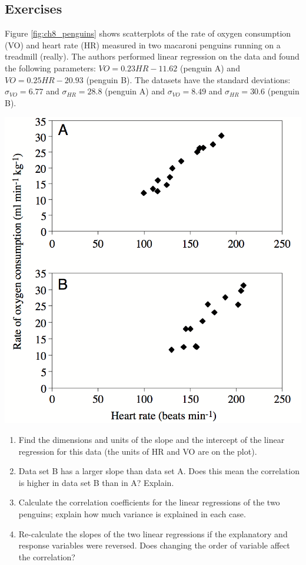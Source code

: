 \documentclass[
  letterpaper,
  DIV=11,
  numbers=noendperiod]{scrreprt}
\begin{document}
\hypertarget{exercises-12}{%
\subsection{Exercises}\label{exercises-12}}

Figure \ref{fig:ch8_penguins} shows scatterplots of the rate of oxygen
consumption (VO) and heart rate (HR) measured in two macaroni penguins
running on a treadmill (really). The authors performed linear regression
on the data and found the following parameters: \(VO =0.23HR - 11.62\)
(penguin A) and \(VO =0.25HR - 20.93\) (penguin B). The datasets have
the standard deviations: \(\sigma_{VO} = 6.77\) and
\(\sigma_{HR} = 28.8\) (penguin A) and \(\sigma_{VO} = 8.49\) and
\(\sigma_{HR} = 30.6\) (penguin B).

\includegraphics{./ch8/penguin_HR.png} \label{fig:ch8_penguins}

\begin{enumerate}
\def\labelenumi{\arabic{enumi}.}
\item
  Find the dimensions and units of the slope and the intercept of the
  linear regression for this data (the units of HR and VO are on the
  plot).
\item
  Data set B has a larger slope than data set A. Does this mean the
  correlation is higher in data set B than in A? Explain.
\item
  Calculate the correlation coefficients for the linear regressions of
  the two penguins; explain how much variance is explained in each case.
\item
  Re-calculate the slopes of the two linear regressions if the
  explanatory and response variables were reversed. Does changing the
  order of variable affect the correlation?
\end{enumerate}
\end{document}
